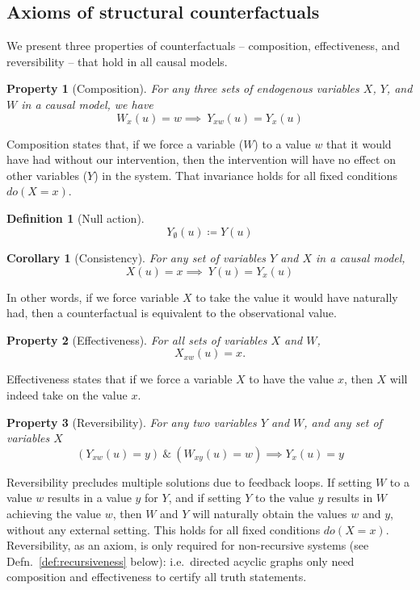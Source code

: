 \documentclass[11pt]{article}
\numberwithin{equation}{section}
\newcommand{\defeq}{\coloneqq}
\newtheorem{defn}{Definition}[section]
\newtheorem{cor}{Corollary}[section]
\newtheorem{prop}{Property}[section]
\begin{document}
\subsection{Axioms of structural counterfactuals}
We present three properties of counterfactuals -- composition, effectiveness, and reversibility -- that hold in all causal models.

\begin{prop}[Composition] \label{prop:composition}
For any three sets of endogenous variables $X$, $Y$, and $W$ in a causal model, we have
\begin{equation}
W_x(u) = w \implies\ Y_{xw}(u) = Y_x(u)
\end{equation}
\end{prop}

Composition states that, if we force a variable ($W$) to a value $w$ that it would have had without our intervention, then the intervention will have no effect on other variables ($Y$) in the system. That invariance holds for all fixed conditions $do(X=x)$.

\begin{defn}[Null action]
\begin{equation}
Y_{\emptyset}(u) \defeq Y(u) \nonumber
\end{equation}
\end{defn}

\begin{cor}[Consistency]  
For any set of variables $Y$ and $X$ in a causal model,
\begin{equation}
X(u)=x \implies\ Y(u) = Y_x(u) \label{eq:consistency}
\end{equation}
\end{cor}
In other words, if we force variable $X$ to take the value it would have naturally had, then a counterfactual is equivalent to the observational value.

\begin{prop}[Effectiveness] \label{prop:effectiveness}
For all sets of variables $X$ and $W$,
\begin{equation}
X_{xw}(u) = x.
\end{equation}
\end{prop} 
Effectiveness states that if we force a variable $X$ to have the value $x$, then $X$ will indeed take on the value $x$.

\begin{prop}[Reversibility] \label{prop:reversibility}
For any two variables $Y$ and $W$, and any set of variables $X$
\begin{equation}
(Y_{xw}(u)=y)\ \&\ (W_{xy}(u)=w) \implies Y_x(u)=y
\end{equation}
\end{prop}
Reversibility precludes multiple solutions due to feedback loops. If setting $W$ to a value $w$ results in a value $y$ for $Y$, and if setting $Y$ to the value $y$ results in $W$ achieving the value $w$, then $W$ and $Y$ will naturally obtain the values $w$ and $y$, without any external setting. This holds for all fixed conditions $do(X=x)$. Reversibility, as an axiom, is only required for non-recursive systems (see Defn.~\ref{def:recursiveness} below): i.e.\ directed acyclic graphs only need composition and effectiveness to certify all truth statements.
\end{document}
